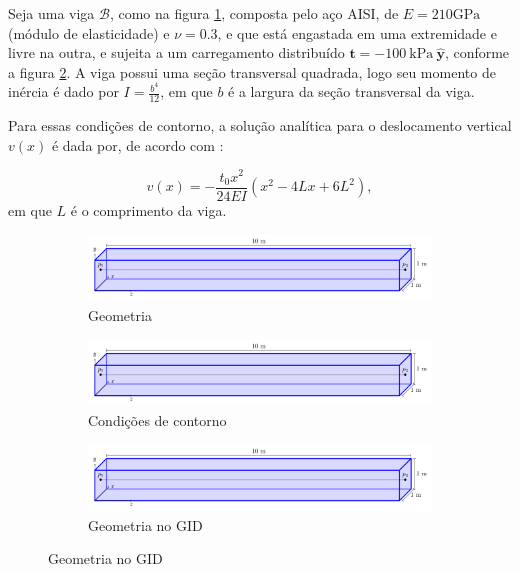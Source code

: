 Seja uma viga $\mathcal{B}$, como na figura \ref{fig:viga_longa_geometria}, composta pelo aço AISI, de $E = 210 \text{GPa}$ (módulo de elasticidade) e $\nu = 0.3$, e que está engastada em uma extremidade e livre na outra, e sujeita a um carregamento distribuído $\bm{t} = -100 \ \text{kPa} \ \hat{\bm{y}}$, conforme a figura \ref{fig:viga_longa_condicoes}. A viga possui uma seção transversal quadrada, logo seu momento de inércia é dado por $I = \frac{b^4}{12}$, em que $b$ é a largura da seção transversal da viga.

Para essas condições de contorno, a solução analítica para o deslocamento vertical $v(x)$ é dada por, de acordo com :

\begin{equation}
    v(x) = -\frac{t_0 x^2}{24EI} \left(x^2 - 4 Lx + 6L^2\right),
\end{equation}
em que $L$ é o comprimento da viga.

\begin{figure}
    \centering
    \caption{Uma viga longa.}
    \begin{subfigure}[c]{\textwidth}
        \centering
        \includegraphics[page=1,width=\textwidth]{Figuras/viga_longa.pdf}
        \caption{Geometria}
        \label{fig:viga_longa_geometria}
    \end{subfigure}
    \begin{subfigure}[c]{\textwidth}
        \centering  
        \includegraphics[page=2, width=\textwidth]{Figuras/viga_longa.pdf}
        \caption{Condições de contorno}
        \label{fig:viga_longa_condicoes}
    \end{subfigure}
    \begin{subfigure}[c]{\textwidth}
        \centering  
        \includegraphics[page=4, width=\textwidth]{Figuras/viga_longa.pdf}
        \caption{Geometria no GID}
        \label{fig:viga_longa_GID}
    \end{subfigure}
\end{figure}

